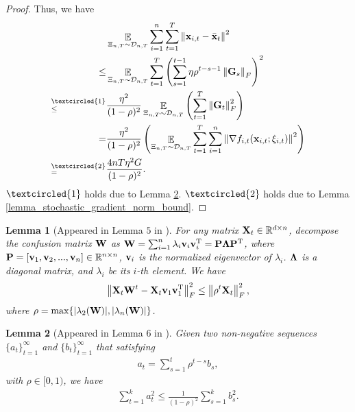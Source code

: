 \documentclass{article}
\newtheorem{Lemma}{\bf{Lemma}}
\begin{document}
\begin{proof}
Thus, we  have
\begin{align}
\nonumber
& \EE_{ \Xi_{n,T} \sim \Dcal_{n,T} } \sum_{i=1}^n\sum_{t=1}^T \lrnorm{\x_{i,t} - \bar{\x}_t}^2  \\ \nonumber 
\le & \EE_{ \Xi_{n,T} \sim \Dcal_{n,T} } \sum_{t=1}^T \lrincir{ \sum_{s=1}^{t-1} \eta \rho^{t-s-1} \lrnorm{\G_s}_F}^2  \\ \nonumber
\refabovecir{\le}{\textcircled{1}} & \frac{\eta^2}{(1-\rho)^2} \EE_{ \Xi_{n,T} \sim \Dcal_{n,T} } \lrincir{  \sum_{t=1}^T \lrnorm{\G_t}_F^2 } \\ \nonumber
= & \frac{\eta^2}{(1-\rho)^2} \lrincir{ \EE_{ \Xi_{n,T} \sim \Dcal_{n,T} } \sum_{t=1}^T \sum_{i=1}^n  \lrnorm{\nabla f_{i,t}(\x_{i,t}; \xi_{i,t})}^2 } \\ \nonumber
\refabovecir{=}{\textcircled{2}} & \frac{4nT\eta^2 G }{(1-\rho)^2}.
\end{align} $\textcircled{1}$ holds due to Lemma \ref{lemma_hanlin_2}.  $\textcircled{2}$ holds due to Lemma \ref{lemma_stochastic_gradient_norm_bound}.



\end{proof}








\begin{Lemma}[Appeared in Lemma $5$ in \citep{Tang:2018un}]
\label{lemma_hanlin_1}
For any matrix ${\bf X}_t\in\mathbb{R}^{d\times n}$, decompose the confusion matrix ${\bf W}$ as ${\bf W} = \sum_{i=1}^n \lambda_i {\bf v}_i {\bf v}_i^{\rm T} = {\bf P} \mathbf{\Lambda} {\bf P}^{\rm T}$, where ${\bf P} = [{\bf v}_1, {\bf v}_2, ..., {\bf v}_n]\in\mathbb{R}^{n\times n}$, ${\bf v}_i$ is the normalized eigenvector of $\lambda_i$. $\mathbf{\Lambda}$ is a diagonal matrix, and $\lambda_i$ be its $i$-th element. We have
\begin{align}
\nonumber
\left\lVert{\bf X}_t {\bf W}^t - {\bf X}_t {\bf v}_1 {\bf v}_1^{\rm T} \right\rVert_F^2 \le \left\lVert\rho^t {\bf X}_t\right\rVert_F^2, 
\end{align} where  $\rho = \max \{| \lambda_2({\bf W}) |, | \lambda_n({\bf W}) |\}$. 

\end{Lemma}


\begin{Lemma}[Appeared in Lemma $6$ in \citep{Tang:2018un}]
\label{lemma_hanlin_2}
Given two non-negative sequences $\{a_t\}_{t=1}^{\infty}$ and $\{b_t\}_{t=1}^{\infty}$ that satisfying
\begin{align}
\nonumber
a_t = \sum_{s=1}^t \rho^{t-s} b_s,
\end{align} with $\rho \in [0,1)$, we have
\begin{align}
\nonumber
\sum_{t=1}^k a_t^2 \le \frac{1}{(1-\rho)^2}\sum_{s=1}^k b_s^2.
\end{align}
\end{Lemma}


















\end{document}
